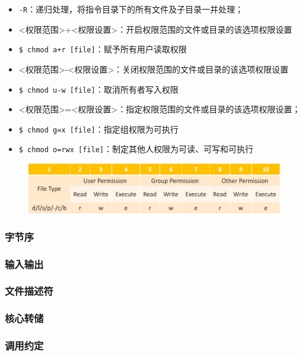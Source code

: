 \begin{itemize}
    \item \verb+-R+：递归处理，将指令目录下的所有文件及子目录一并处理；
    \item <权限范围>+<权限设置>：开启权限范围的文件或目录的该选项权限设置
    \item \verb|$ chmod a+r [file]|：赋予所有用户读取权限
    \item <权限范围>-<权限设置>：关闭权限范围的文件或目录的该选项权限设置
    \item \verb+$ chmod u-w [file]+：取消所有者写入权限
    \item <权限范围>=<权限设置>：指定权限范围的文件或目录的该选项权限设置；
    \item \verb+$ chmod g=x [file]+：指定组权限为可执行
    \item \verb+$ chmod o=rwx [file]+：制定其他人权限为可读、可写和可执行
\end{itemize}
\indent 
\begin{figure}
\includegraphics[]{images/content/1.3_file.png}
\end{figure}

\subsubsection{字节序}
\indent \setlength{\parindent}{2em}

\subsubsection{输入输出}
\indent \setlength{\parindent}{2em}

\subsubsection{文件描述符}
\indent \setlength{\parindent}{2em}

\subsubsection{核心转储}
\indent \setlength{\parindent}{2em}

\subsubsection{调用约定}
\indent \setlength{\parindent}{2em}

